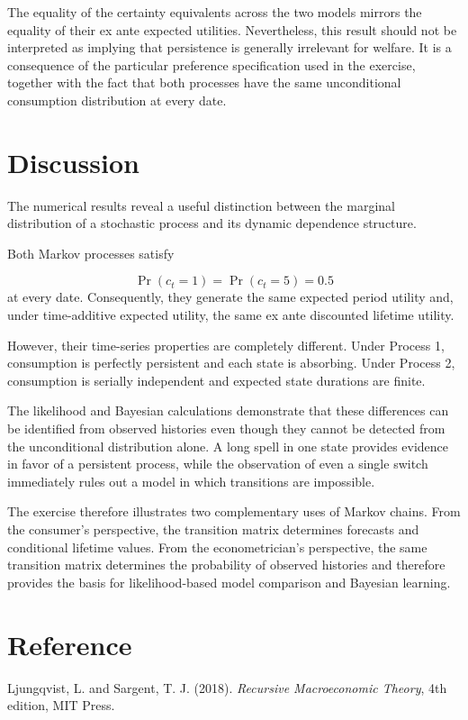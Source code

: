 \documentclass[11pt]{article}
\begin{document}
The equality of the certainty equivalents across the two models mirrors the
equality of their ex ante expected utilities. Nevertheless, this result should
not be interpreted as implying that persistence is generally irrelevant for
welfare. It is a consequence of the particular preference specification used in
the exercise, together with the fact that both processes have the same
unconditional consumption distribution at every date.

\section*{Discussion}

The numerical results reveal a useful distinction between the marginal
distribution of a stochastic process and its dynamic dependence structure.

Both Markov processes satisfy

\[
\Pr(c_t=1)=\Pr(c_t=5)=0.5
\]
at every date. Consequently, they generate the same expected period utility and,
under time-additive expected utility, the same ex ante discounted lifetime
utility.

However, their time-series properties are completely different. Under Process 1,
consumption is perfectly persistent and each state is absorbing. Under Process 2,
consumption is serially independent and expected state durations are finite.

The likelihood and Bayesian calculations demonstrate that these differences can
be identified from observed histories even though they cannot be detected from
the unconditional distribution alone. A long spell in one state provides evidence
in favor of a persistent process, while the observation of even a single switch
immediately rules out a model in which transitions are impossible.

The exercise therefore illustrates two complementary uses of Markov chains.
From the consumer's perspective, the transition matrix determines forecasts and
conditional lifetime values. From the econometrician's perspective, the same
transition matrix determines the probability of observed histories and therefore
provides the basis for likelihood-based model comparison and Bayesian learning.


\section*{Reference}

Ljungqvist, L. and Sargent, T. J. (2018).
\textit{Recursive Macroeconomic Theory},
4th edition, MIT Press.
\end{document}
